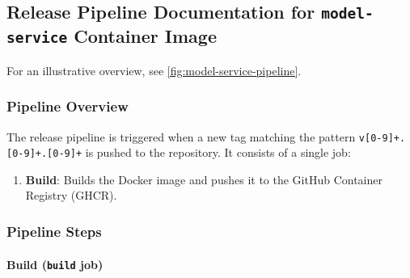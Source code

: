         

\subsection{Release Pipeline Documentation for \texttt{model-service} Container Image}\label{sec:release-model-service}
For an illustrative overview, see \autoref{fig:model-service-pipeline}.

\subsubsection{Pipeline Overview}

The release pipeline is triggered when a new tag matching the pattern \texttt{v[0-9]+.[0-9]+.[0-9]+} is pushed to the repository. It consists of a single job:

\begin{enumerate}
    \item \textbf{Build}: Builds the Docker image and pushes it to the GitHub Container Registry (GHCR).
\end{enumerate}

\subsubsection{Pipeline Steps}

\paragraph{Build (\texttt{build} job)}

